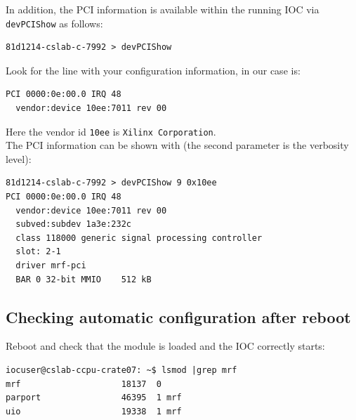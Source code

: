 \documentclass[11pt
  , a4paper
  , article
  , oneside
  , showtrims
]{memoir}
\begin{document}
In addition, the PCI information is available within the running IOC via \texttt{devPCIShow} as follows:
\begin{lstlisting}
81d1214-cslab-c-7992 > devPCIShow
\end{lstlisting}
Look for the line with your configuration information, in our case is:
\begin{lstlisting}
PCI 0000:0e:00.0 IRQ 48
  vendor:device 10ee:7011 rev 00
\end{lstlisting}
Here the vendor id \texttt{10ee} is \texttt{Xilinx Corporation}.\\

The PCI information can be shown with (the second parameter is the verbosity level):
\begin{lstlisting}
81d1214-cslab-c-7992 > devPCIShow 9 0x10ee
PCI 0000:0e:00.0 IRQ 48
  vendor:device 10ee:7011 rev 00
  subved:subdev 1a3e:232c
  class 118000 generic signal processing controller
  slot: 2-1
  driver mrf-pci
  BAR 0 32-bit MMIO    512 kB
\end{lstlisting}

\subsection{Checking automatic configuration after reboot}
Reboot and check that the module is loaded and the IOC correctly starts:
\begin{lstlisting}[style=termstyle]
iocuser@cslab-ccpu-crate07: ~$ lsmod |grep mrf
mrf                    18137  0
parport                46395  1 mrf
uio                    19338  1 mrf
\end{lstlisting}


\end{document}
